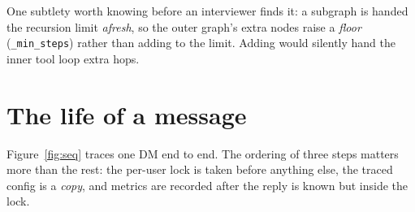 \documentclass[11pt,a4paper]{article}
\begin{document}
One subtlety worth knowing before an interviewer finds it: a subgraph is handed the
recursion limit \emph{afresh}, so the outer graph's extra nodes raise a \emph{floor}
(\texttt{\_\allowbreak{}min\_\allowbreak{}steps}) rather than adding to the limit. Adding would silently hand the
inner tool loop extra hops.

\section{The life of a message}

Figure~\ref{fig:seq} traces one DM end to end. The ordering of three steps matters more
than the rest: the per-user lock is taken before anything else, the traced config is a
\emph{copy}, and metrics are recorded after the reply is known but inside the lock.
\end{document}
